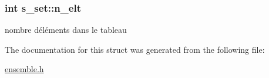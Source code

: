 \subsubsection[{\texorpdfstring{n\+\_\+elt}{n_elt}}]{\setlength{\rightskip}{0pt plus 5cm}int s\+\_\+set\+::n\+\_\+elt}\hypertarget{structs__set_ac5d24903f7f143cd44e352c622837c64}{}\label{structs__set_ac5d24903f7f143cd44e352c622837c64}
nombre d\textquotesingle{}éléments dans le tableau 

The documentation for this struct was generated from the following file\+:\begin{DoxyCompactItemize}
\item 
\hyperlink{ensemble_8h}{ensemble.\+h}\end{DoxyCompactItemize}
